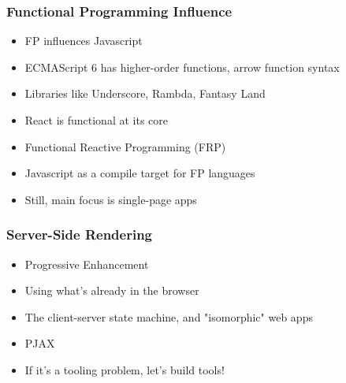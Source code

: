 \begin{frame}
  \frametitle{Functional Programming Influence}
  \begin{itemize}
    \pause
    \item<+-> FP influences Javascript
    \item<+-> ECMAScript 6 has higher-order functions, arrow function syntax
    \item<+-> Libraries like Underscore, Rambda, Fantasy Land
    \item<+-> React is functional at its core
    \item<+-> Functional Reactive Programming (FRP)
    \item<+-> Javascript as a compile target for FP languages
    \item<+-> Still, main focus is single-page apps
  \end{itemize}
\end{frame}

\begin{frame}
\end{frame}

\begin{frame}
  \frametitle{Server-Side Rendering}
  \begin{itemize}
    \pause
    \item<+-> Progressive Enhancement
    \item<+-> Using what's already in the browser
    \item<+-> The client-server state machine, and "isomorphic" web apps
    \item<+-> PJAX
    \item<+-> If it's a tooling problem, let's build tools!
  \end{itemize}
\end{frame}

\begin{frame}
\end{frame}

